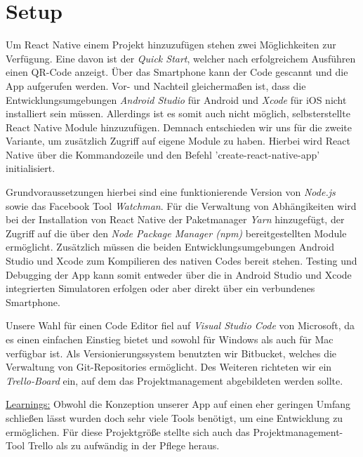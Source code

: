 \section{Setup}
Um React Native einem Projekt hinzuzufügen stehen zwei Möglichkeiten zur Verfügung.
Eine davon ist der \emph{Quick Start}, welcher nach erfolgreichem Ausführen einen QR-Code anzeigt.
Über das Smartphone kann der Code gescannt und die App aufgerufen werden.
Vor- und Nachteil gleichermaßen ist, dass die Entwicklungsumgebungen \emph{Android Studio} für Android und \emph{Xcode} für iOS nicht installiert sein müssen.
Allerdings ist es somit auch nicht möglich, selbsterstellte React Native Module hinzuzufügen.
Demnach entschieden wir uns für die zweite Variante, um zusätzlich Zugriff auf eigene Module zu haben.
Hierbei wird React Native über die Kommandozeile und den Befehl 'create-react-native-app' initialisiert.

Grundvoraussetzungen hierbei sind eine funktionierende Version von \emph{Node.js} sowie das Facebook Tool \emph{Watchman}.
Für die Verwaltung von Abhängikeiten wird bei der Installation von React Native der Paketmanager \emph{Yarn} hinzugefügt, der Zugriff auf die über den \emph{Node Package Manager (npm)} bereitgestellten Module ermöglicht.
Zusätzlich müssen die beiden Entwicklungsumgebungen Android Studio und Xcode zum Kompilieren des nativen Codes bereit stehen.
Testing und Debugging der App kann somit entweder über die in Android Studio und Xcode integrierten Simulatoren erfolgen oder aber direkt über ein verbundenes Smartphone.

Unsere Wahl für einen Code Editor fiel auf \emph{Visual Studio Code} von Microsoft, da es einen einfachen Einstieg bietet und sowohl für Windows als auch für Mac verfügbar ist.
Als Versionierungssystem benutzten wir Bitbucket, welches die Verwaltung von Git-Repositories ermöglicht.
Des Weiteren richteten wir ein \emph{Trello-Board} ein, auf dem das Projektmanagement abgebildeten werden sollte.

\underline{Learnings:}
Obwohl die Konzeption unserer App auf einen eher geringen Umfang schließen lässt wurden doch sehr viele Tools benötigt, um eine Entwicklung zu ermöglichen.
Für diese Projektgröße stellte sich auch das Projektmanagement-Tool Trello als zu aufwändig in der Pflege heraus.




